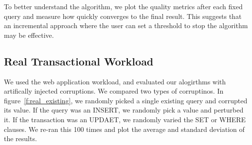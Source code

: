 To better understand the algorithm, we plot the quality metrics after each fixed query and measure how quickly \sys converges to the final result. 
This suggests that an incremental approach where the user can set a threshold to stop the algorithm may be effective.



\subsection{Real Transactional Workload}

We used the web application workload, and evaluated our alogirthms with artifically injected corruptions.
We compared two types of corruptinos.  In figure~\ref{f:real_existing}, we randomly picked a single existing 
query and corrupted its value.  If the query was an INSERT, we randomly pick a value and perturbed it.
If the transaction was an UPDAET, we randomly varied the SET or WHERE clauses.   We re-ran this
100 times and plot the average and standard deviation of the results.

